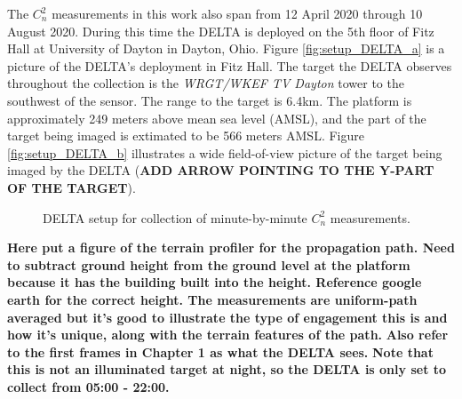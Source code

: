 The $C_{n}^{2}$ measurements in this work also span from 12 April 2020 through 10 August 2020. During this time the DELTA is deployed on the 5th floor of Fitz Hall at University of Dayton in Dayton, Ohio. Figure \ref{fig:setup_DELTA_a} is a picture of the DELTA's deployment in Fitz Hall. The target the DELTA observes throughout the collection is the \textit{WRGT/WKEF TV Dayton} tower to the southwest of the sensor. The range to the target is 6.4km. The platform is approximately 249 meters above mean sea level (AMSL), and the part of the target being imaged is extimated to be 566 meters AMSL. Figure \ref{fig:setup_DELTA_b} illustrates a wide field-of-view picture of the target being imaged by the DELTA (\textbf{ADD ARROW POINTING TO THE Y-PART OF THE TARGET}).
\begin{figure}[h!]
	\centering
	\hfill
	\caption{DELTA setup for collection of minute-by-minute $C_{n}^{2}$ measurements.}
	\label{fig:setup_DELTA}
\end{figure}


\textbf{Here put a figure of the terrain profiler for the propagation path. Need to subtract ground height from the ground level at the platform because it has the building built into the height. Reference google earth for the correct height. The measurements are uniform-path averaged but it's good to illustrate the type of engagement this is and how it's unique, along with the terrain features of the path.}
\textbf{Also refer to the first frames in Chapter 1 as what the DELTA sees.}
\textbf{Note that this is not an illuminated target at night, so the DELTA is only set to collect from 05:00 - 22:00.}

